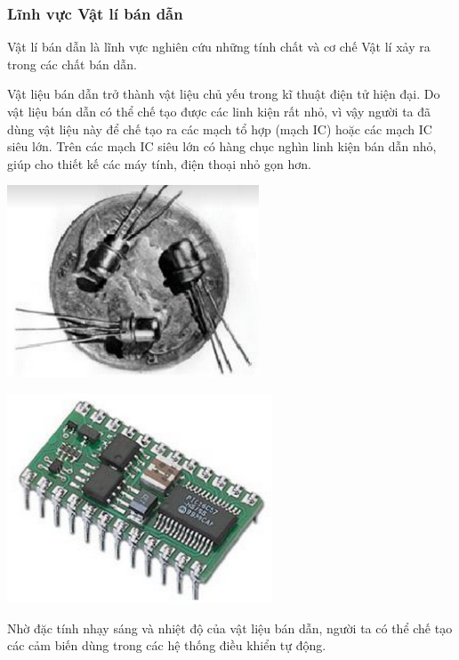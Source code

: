 \subsubsection{Lĩnh vực Vật lí bán dẫn}
Vật lí bán dẫn là lĩnh vực nghiên cứu những tính chất và cơ chế Vật lí xảy ra trong các chất bán dẫn.

\begin{minipage}[l]{0.6\textwidth}
Vật liệu bán dẫn trở thành vật liệu chủ yếu trong kĩ thuật điện tử hiện đại. Do vật liệu bán dẫn có thể chế tạo được các linh kiện rất nhỏ, vì vậy người ta đã dùng vật liệu này để chế tạo ra các mạch tổ hợp (mạch IC) hoặc các mạch IC siêu lớn. Trên các mạch IC siêu lớn có hàng chục nghìn linh kiện bán dẫn nhỏ, giúp cho thiết kế các máy tính, điện thoại nhỏ gọn hơn.
\end{minipage}
\begin{minipage}[r]{0.4\textwidth}
\begin{center}
	\includegraphics[scale=0.4]{../figs/G10-002-11}
\end{center}
\begin{center}
	\includegraphics[scale=0.4]{../figs/G10-002-12}
\end{center}
\end{minipage}

Nhờ đặc tính nhạy sáng và nhiệt độ của vật liệu bán dẫn, người ta có thể chế tạo các cảm biến dùng trong các hệ thống điều khiển tự động.
